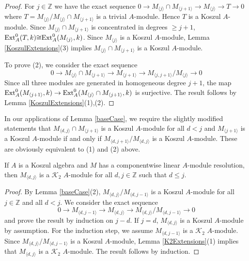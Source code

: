 \documentclass[11pt,righttag]{amsart}
\begin{document}
\begin{proof}
For $j\in{{\mathbb Z}}$ we have the exact sequence
$0\rightarrow M_{{\langle} j{\rangle}}\cap M_{{\langle} j+1{\rangle}}\rightarrow M_{{\langle} j{\rangle}}\rightarrow T\rightarrow 0$
where $T=M_{{\langle} j{\rangle}}/M_{{\langle} j{\rangle}}\cap M_{{\langle} j+1{\rangle}}$ is a trivial $A$-module. Hence $T$ is a Koszul $A$-module. Since $M_{{\langle} j{\rangle}}\cap M_{{\langle} j+1 {\rangle}}$ is concentrated in degrees $\ge j+1$, ${\hbox{{\rm Ext}}}_A^0(T,k){\cong} {\hbox{{\rm Ext}}}_A^0(M_{{\langle} j{\rangle}}, k)$. Since $M_{{\langle} j{\rangle}}$ is a Koszul $A$-module, Lemma \ref{KoszulExtensions}(3) implies $M_{{\langle} j{\rangle}}\cap M_{{\langle} j+1 {\rangle}}$ is a Koszul $A$-module.

To prove (2), we consider the exact sequence
$$0\rightarrow M_{{\langle} j{\rangle}}\cap M_{{\langle} j+1{\rangle}}\rightarrow M_{{\langle} j+1{\rangle}}\rightarrow M_{{\langle} j,j+1{\rangle}}/M_{{\langle} j{\rangle}}\rightarrow 0$$ 
 Since all three modules are generated in homogeneous degree $j+1$, the  map ${\hbox{{\rm Ext}}}_A^0(M_{{\langle} j+1{\rangle}},k)\rightarrow {\hbox{{\rm Ext}}}_A^0( M_{{\langle} j{\rangle}}\cap M_{{\langle} j+1{\rangle}},k)$ is surjective. The result follows by Lemma \ref{KoszulExtensions}(1),(2).

\end{proof}

\begin{rmk}
\label{baseCase2}
In our applications of Lemma \ref{baseCase}, we require the slightly modified statements that $M_{{\langle} d,j{\rangle}}\cap M_{{\langle} j+1{\rangle}}$ is a Koszul $A$-module for all $d<j$ and $M_{{\langle} j+1{\rangle}}$ is a Koszul $A$-module if and only if $M_{{\langle} d,j+1{\rangle}}/M_{{\langle} d, j{\rangle}}$ is a Koszul $A$-module. These are obviously equivalent to (1) and (2) above.
\end{rmk}

\begin{lemma}
\label{intervalModulesK2}
If $A$ is a Koszul algebra and $M$ has a componentwise linear $A$-module resolution, then
 $M_{{\langle} d,j{\rangle}}$ is a ${{\mathcal K}}_2$ $A$-module for all $d,j\in{{\mathbb Z}}$ such that $d\le j$.
\end{lemma}

\begin{proof}
By Lemma \ref{baseCase}(2), $M_{{\langle} d,j{\rangle}}/M_{{\langle} d,j-1{\rangle}}$ is a Koszul $A$-module for all $j\in{{\mathbb Z}}$ and all $d<j$.
We consider the exact sequence
$$0\rightarrow M_{{\langle} d,j-1{\rangle}}\rightarrow M_{{\langle} d,j{\rangle}}\rightarrow M_{{\langle} d,j{\rangle}}/M_{{\langle} d,j-1{\rangle}}\rightarrow 0$$
and prove the result by induction on $j-d$. If $j=d$, $M_{{\langle} d,j{\rangle}}$ is a Koszul $A$-module by assumption. For the induction step, we assume $M_{{\langle} d,j-1{\rangle}}$ is  a ${{\mathcal K}}_2$ $A$-module. Since $M_{{\langle} d,j{\rangle}}/M_{{\langle} d,j-1{\rangle}}$ is a Koszul $A$-module, Lemma \ref{K2Extensions}(1) implies that $M_{{\langle} d,j{\rangle}}$ is a ${{\mathcal K}}_2$ $A$-module. The result follows by induction.

\end{proof}
\end{document}

